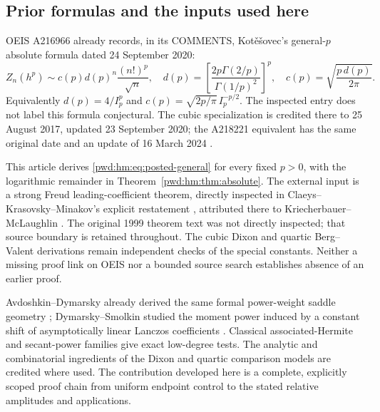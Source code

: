 \documentclass[11pt,letterpaper]{article}
\numberwithin{equation}{section}
\theoremstyle{remark}\newtheorem{remark}[theorem]{Remark}
\begin{document}
\subsection{Prior formulas and the inputs used here}
OEIS A216966 already records, in its COMMENTS, Kot\v e\v sovec's general-$p$ absolute formula dated 24 September 2020:
\begin{equation}\label{pwd:hm:eq:posted-general}
 Z_n(h^p)\sim c(p)d(p)^n\frac{(n!)^p}{\sqrt n},\quad
 d(p)=\left[\frac{2p\Gamma(2/p)}{\Gamma(1/p)^2}\right]^p,\quad
 c(p)=\sqrt{\frac{p\,d(p)}{2\pi}}.
\end{equation}
Equivalently $d(p)=4/I_p^p$ and $c(p)=\sqrt{2p/\pi}\,I_p^{-p/2}$. The inspected entry does not label this formula conjectural. The cubic specialization is credited there to 25 August 2017, updated 23 September 2020; the A218221 equivalent has the same original date and an update of 16 March 2024 \cite{oeiscubic}.

This article derives \eqref{pwd:hm:eq:posted-general} for every fixed $p>0$, with the logarithmic remainder in Theorem~\ref{pwd:hm:thm:absolute}. The external input is a strong Freud leading-coefficient theorem, directly inspected in Claeys--Krasovsky--Minakov's explicit restatement \cite[Eq. (2.3)]{ckm}, attributed there to Kriecherbauer--McLaughlin \cite[Theorem 1.5]{km}. The original 1999 theorem text was not directly inspected; that source boundary is retained throughout. The cubic Dixon and quartic Berg--Valent derivations remain independent checks of the special constants. Neither a missing proof link on OEIS nor a bounded source search establishes absence of an earlier proof.

Avdoshkin--Dymarsky already derived the same formal power-weight saddle geometry \cite[Appendix C]{avdoshkin}; Dymarsky--Smolkin studied the moment power induced by a constant shift of asymptotically linear Lanczos coefficients \cite{dymarsky}. Classical associated-Hermite and secant-power families give exact low-degree tests. The analytic and combinatorial ingredients of the Dixon and quartic comparison models are credited where used. The contribution developed here is a complete, explicitly scoped proof chain from uniform endpoint control to the stated relative amplitudes and applications.
\end{document}

